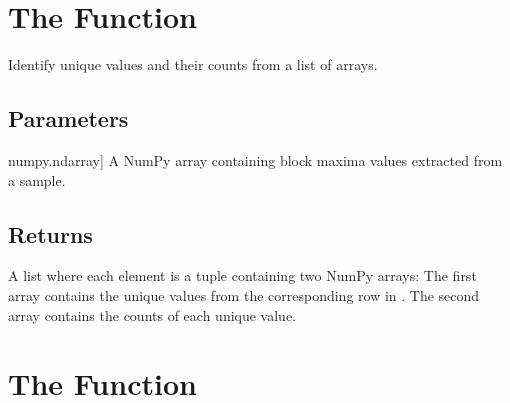 \documentclass[a4paper,11pt,openany,english]{sphinxmanual}
\begin{document}
\section{The  Function}
\label{\detokenize{api_bootstrap:the-uniquening-function}}

\begin{fulllineitems}
\label{\detokenize{api_bootstrap:xtremes.bootstrap.uniquening}}
\pysigstartsignatures
{}
\pysigstopsignatures
\sphinxAtStartPar
Identify unique values and their counts from a list of arrays.


\subsection{Parameters}
\label{\detokenize{api_bootstrap:id11}}\begin{description}
\sphinxlineitem{circmaxs}{[}numpy.ndarray{]}
\sphinxAtStartPar
A NumPy array containing block maxima values extracted from a sample.

\end{description}


\subsection{Returns}
\label{\detokenize{api_bootstrap:id12}}\begin{description}
\sphinxAtStartPar
A list where each element is a tuple containing two NumPy arrays:
\sphinxhyphen{} The first array contains the unique values from the corresponding row in .
\sphinxhyphen{} The second array contains the counts of each unique value.

\end{description}

\end{fulllineitems}



\section{The  Function}
\label{\detokenize{api_bootstrap:the-bootstrap-function}}
\end{document}
